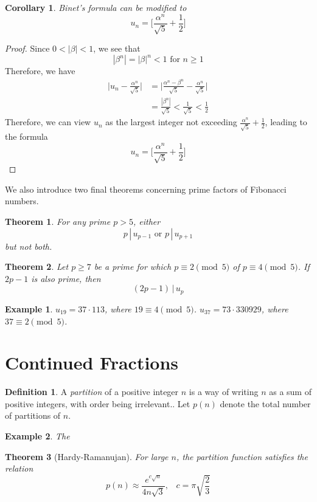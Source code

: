 \documentclass{article}
\newtheorem{theorem}{Theorem}[section]
\newtheorem{example}{Example}[section]
\newtheorem{corollary}{Corollary}[theorem]
\theoremstyle{remark}
\theoremstyle{definition}
\newtheorem{definition}{Definition}[section]
\begin{document}
\begin{corollary}
Binet's formula can be modified to
\[u_n = \bigg[ \frac{\alpha^n}{\sqrt{5}} + \frac{1}{2} \bigg]\]
\end{corollary}
\begin{proof}
Since $0<|\beta|<1$, we see that 
\[|\beta^n| = |\beta|^n < 1 \text{ for } n \geq 1\]
Therefore, we have 
\begin{align*}
    \bigg| u_n - \frac{\alpha^n}{\sqrt{5}} \bigg| & = \bigg| \frac{\alpha^n - \beta^n}{\sqrt{5}} - \frac{\alpha^n}{\sqrt{5}} \bigg| \\
    & = \frac{|\beta^n|}{\sqrt{5}} < \frac{1}{\sqrt{5}} < \frac{1}{2}
\end{align*}
Therefore, we can view $u_n$ as the largest integer not exceeding $\frac{\alpha^n}{\sqrt{5}} + \frac{1}{2}$, leading to the formula 
\[u_n = \bigg[ \frac{\alpha^n}{\sqrt{5}} + \frac{1}{2} \bigg]\]
\end{proof}

We also introduce two final theorems concerning prime factors of Fibonacci numbers. 

\begin{theorem}
For any prime $p > 5$, either 
\[p\,|\,u_{p-1} \text{ or } p \,|\, u_{p+1}\]
but not both. 
\end{theorem}

\begin{theorem}
Let $p\geq 7$ be a prime for which $p \equiv 2 \pmod{5}$ of $p \equiv 4 \pmod{5}$. If $2p-1$ is also prime, then 
\[(2p-1)\,\big|\, u_p\]
\end{theorem}

\begin{example}
$u_19 = 37 \cdot 113$, where $19 \equiv 4 \pmod{5}$. $u_{37} = 73 \cdot 330929$, where $37 \equiv 2 \pmod{5}$. 
\end{example}
\section{Continued Fractions}
\begin{definition}
A \textit{partition} of a positive integer $n$ is a way of writing $n$ as a sum of positive integers, with order being irrelevant.. Let $p(n)$ denote the total number of partitions of $n$. 
\end{definition}

\begin{example}
The 
\end{example}

\begin{theorem}[Hardy-Ramanujan]
For large $n$, the partition function satisfies the relation
\[p(n) \approx \frac{e^{c\sqrt{n}}}{4n \sqrt{3}}, \;\;\; c = \pi \sqrt{\frac{2}{3}}\]
\end{theorem}
\end{document}
